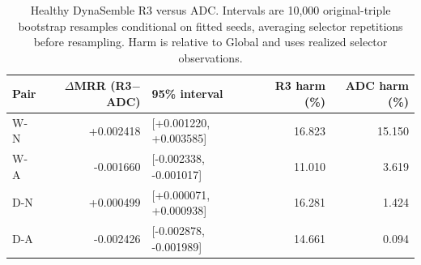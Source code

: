 \begin{table}[htbp]
\centering\small
\setlength{\tabcolsep}{4pt}
\caption{Healthy DynaSemble R3 versus ADC. Intervals are 10,000 original-triple bootstrap resamples conditional on fitted seeds, averaging selector repetitions before resampling. Harm is relative to Global and uses realized selector observations.}
\label{tab:dyna-effects}
\begin{tabular}{lr lrr}
\toprule
Pair & $\Delta$MRR (R3$-$ADC) & 95\% interval & R3 harm (\%) & ADC harm (\%)\\
\midrule
W-N & +0.002418 & [+0.001220, +0.003585] & 16.823 & 15.150\\
W-A & -0.001660 & [-0.002338, -0.001017] & 11.010 & 3.619\\
D-N & +0.000499 & [+0.000071, +0.000938] & 16.281 & 1.424\\
D-A & -0.002426 & [-0.002878, -0.001989] & 14.661 & 0.094\\
\bottomrule
\end{tabular}
\end{table}
